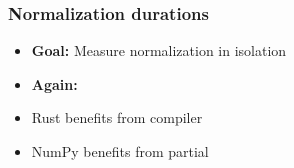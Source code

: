 \documentclass[t,english]{beamer}
\begin{document}
\begin{frame}
    \frametitle{Normalization durations}
        \begin{itemize}
        \item \textbf{Goal:} Measure normalization in isolation
        \end{itemize}

    \begin{itemize}
        \item<3-> \textbf{Again:}
        \item<3-> Rust benefits from compiler
        \item<3->  NumPy benefits from partial
    \end{itemize}
\end{frame}
\end{document}
